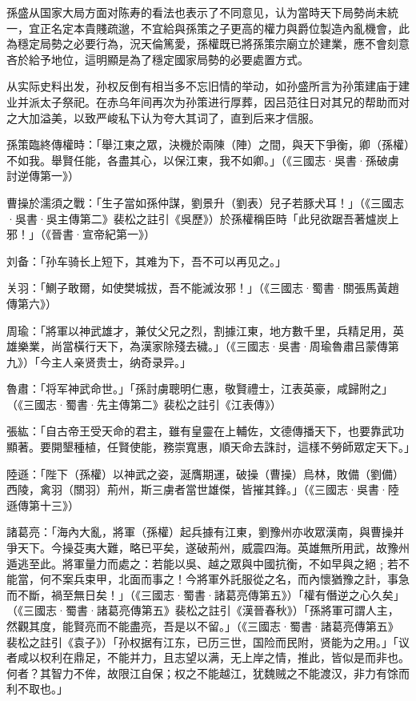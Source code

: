 孫盛从国家大局方面对陈寿的看法也表示了不同意见，认为當時天下局勢尚未統一，宜正名定本貴賤疏邈，不宜給與孫策之子更高的權力與爵位製造內亂機會，此為穩定局勢之必要行為，況天倫篤愛，孫權既已將孫策宗廟立於建業，應不會刻意吝於給予地位，這明顯是為了穩定國家局勢的必要處置方式。

从实际史料出发，孙权反倒有相当多不忘旧情的举动，如孙盛所言为孙策建庙于建业并派太子祭祀。在赤乌年间再次为孙策进行厚葬，因吕范往日对其兄的帮助而对之大加溢美，以致严峻私下认为夸大其词了，直到后来才信服。

孫策臨終傳權時：「舉江東之眾，決機於兩陳（陣）之間，與天下爭衡，卿（孫權）不如我。舉賢任能，各盡其心，以保江東，我不如卿。」（《三國志·吳書·孫破虜討逆傳第一》）

曹操於濡須之戰：「生子當如孫仲謀，劉景升（劉表）兒子若豚犬耳！」（《三國志·吳書·吳主傳第二》裴松之註引《吳歷》）於孫權稱臣時「此兒欲踞吾著爐炭上邪！」（《晉書·宣帝紀第一》）

刘备：「孙车骑长上短下，其难为下，吾不可以再见之。」

关羽：「鰂子敢爾，如使樊城拔，吾不能滅汝邪！」（《三國志·蜀書·關張馬黃趙傳第六》）

周瑜：「將軍以神武雄才，兼仗父兄之烈，割據江東，地方數千里，兵精足用，英雄樂業，尚當橫行天下，為漢家除殘去穢。」（《三國志·吳書·周瑜魯肅吕蒙傳第九》）「今主人亲贤贵士，纳奇录异。」

魯肅：「将军神武命世。」「孫討虜聰明仁惠，敬賢禮士，江表英豪，咸歸附之」（《三國志·蜀書·先主傳第二》裴松之註引《江表傳》）

張紘：「自古帝王受天命的君主，雖有皇靈在上輔佐，文德傳播天下，也要靠武功顯著。要開墾種植，任賢使能，務崇寬惠，順天命去誅討，這樣不勞師眾定天下。」

陸遜：「陛下（孫權）以神武之姿，涎膺期運，破操（曹操）烏林，敗備（劉備）西陵，禽羽（關羽）荊州，斯三虜者當世雄傑，皆摧其鋒。」（《三國志·吳書·陸遜傳第十三》）

諸葛亮：「海內大亂，將軍（孫權）起兵據有江東，劉豫州亦收眾漢南，與曹操并爭天下。今操芟夷大難，略已平矣，遂破荊州，威震四海。英雄無所用武，故豫州遁逃至此。將軍量力而處之：若能以吳、越之眾與中國抗衡，不如早與之絕﹔若不能當，何不案兵束甲，北面而事之！今將軍外託服從之名，而內懷猶豫之計，事急而不斷，禍至無日矣！」（《三國志·蜀書·諸葛亮傳第五》）「權有僭逆之心久矣」（《三國志·蜀書·諸葛亮傳第五》裴松之註引《漢晉春秋》）「孫將軍可謂人主，然觀其度，能賢亮而不能盡亮，吾是以不留。」（《三國志·蜀書·諸葛亮傳第五》裴松之註引《袁子》）「孙权据有江东，已历三世，国险而民附，贤能为之用。」「议者咸以权利在鼎足，不能并力，且志望以满，无上岸之情，推此，皆似是而非也。何者？其智力不侔，故限江自保；权之不能越江，犹魏贼之不能渡汉，非力有馀而利不取也。」

